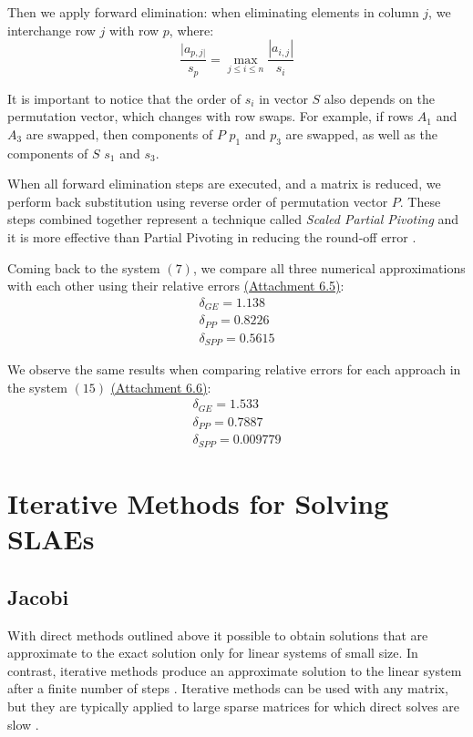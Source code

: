 \documentclass[letterpaper,12pt]{article}
\begin{document}
Then we apply forward elimination: when eliminating elements in column $j$, we interchange row $j$ with row $p$, where:
\begin{equation}
    \frac{|a_{p,j|}}{s_p} = \displaystyle\max_{j \le i \le n}\frac{|a_{i,j}|}{s_i}
\end{equation}

It is important to notice that the order of $s_i$ in vector $S$ also depends on the permutation vector, which changes with row swaps. For example, if rows $A_1$ and $A_3$ are swapped, then components of $P$ $p_1$ and $p_3$ are swapped, as well as the components of $S$ $s_1$ and $s_3$.

When all forward elimination steps are executed, and a matrix is reduced, we perform back substitution using reverse order of permutation vector $P$. These steps combined together represent a technique called \textit{Scaled Partial Pivoting} and it is more effective than Partial Pivoting in reducing the round-off error \cite{spp, spperror}.

Coming back to the system $(7)$, we compare all three numerical approximations with each other using their relative errors \hyperref[a:E5]{(Attachment 6.5)}:
\begin{equation}
    \begin{array}{l}
       \delta_{GE} = 1.138\\
       \delta_{PP} = 0.8226\\
       \delta_{SPP} = 0.5615
    \end{array}
\end{equation}

We observe the same results when comparing relative errors for each approach in the system $(15)$ \hyperref[a:E6]{(Attachment 6.6)}:
\begin{equation}
    \begin{array}{l}
       \delta_{GE} = 1.533\\
       \delta_{PP} = 0.7887\\
       \delta_{SPP} = 0.009779
    \end{array}
\end{equation}

\section{Iterative Methods for Solving SLAEs}
\subsection{Jacobi}
With direct methods outlined above it possible to obtain solutions that are approximate to the exact solution only for linear systems of small size. In contrast, iterative methods produce an approximate solution to the linear system after a finite number of steps \cite{iterative}. Iterative methods can be used with any matrix, but they are typically applied to large sparse matrices for which direct solves are slow \cite{iterative2}.
\end{document}
